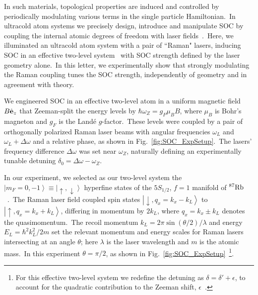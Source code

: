 \documentclass[twocolumn,amsmath,amssymb,floatfix,prl]{revtex4-1}
\newcommand{\ket}[1]{\left|#1\right>}
\begin{document}
In such materials, topological properties are induced and controlled by periodically modulating various terms in the single particle Hamiltonian.~In ultracold atom systems we precisely design, introduce and manipulate SOC by coupling the internal atomic degrees of freedom with laser fields~\cite{Dalibard2010}.~Here, we illuminated an ultracold atom system with a pair of ``Raman" lasers, inducing SOC in an effective two-level system~\cite{LinSOC_2011, Spielman2009,Cheuk2012,Wang2012,Zhang2012a,Hamner2014} with SOC strength defined by the laser geometry alone.~In this letter, we experimentally show that strongly modulating the Raman coupling tunes the SOC strength, independently of geometry and in agreement with theory.

We engineered SOC in an effective two-level atom in a uniform magnetic field $B\hat{\bf e}_z$ that Zeeman-split the energy levels by $\hbar \omega_Z=g_F \mu_B B$, where $\mu_B$ is Bohr's
magneton and $g_F$ is the Land{\'e} $g$-factor.~These levels were coupled by a pair of orthogonally polarized Raman laser beams with angular frequencies $\omega_L$ and $\omega_L + \Delta \omega$ and a relative phase, as shown in Fig.~\ref{fig:SOC_ExpSetup}.~The lasers' frequency difference $\Delta \omega$ was set near $\omega_{Z}$, naturally defining an experimentally tunable detuning $\delta_0 = \Delta \omega - \omega_{Z}$.

In our experiment, we selected as our two-level system the $\ket{m_F = 0, -1} \equiv \ket{ \uparrow, \downarrow}$ hyperfine states of the $5S_{1/2}$, $f=1$ manifold of $^{87}\rm Rb$~\cite{LinSOC_2011}.~The Raman laser field coupled spin states $ {\ket{\downarrow, q_x = k_x - k_L}}$ to ${\ket{\uparrow, q_x = k_x + k_L}} $, differing in momentum by $2k_L$, where $q_x = k_x \pm k_L$ denotes the quasimomentum.~The recoil momentum ${k_L=2\pi \sin(\theta/2) / \lambda}$ and energy ${E_L = \hbar^2 k_L^2 / 2 m}$ set the relevant momentum and energy scales for Raman lasers intersecting at an angle $\theta$; here $\lambda$ is the laser wavelength and $m$ is the atomic mass.~In this experiment ${\theta = \pi /2}$, as shown in Fig.~\ref{fig:SOC_ExpSetup}~\footnote{For this effective two-level system we redefine the detuning as $\delta = \delta' + \epsilon$, to account for the quadratic contribution to the Zeeman shift, $\epsilon$~\cite{LinSOC_2011}.}.
\end{document}
